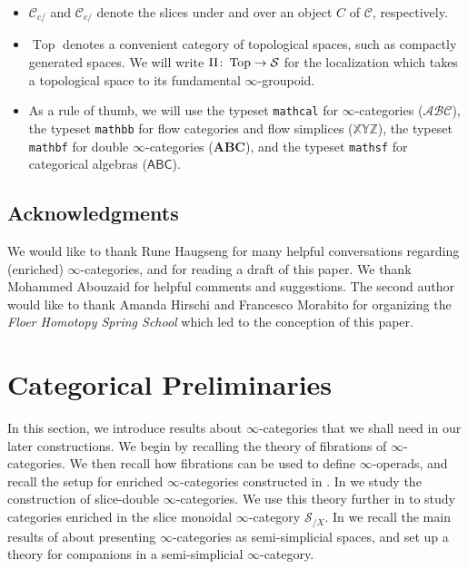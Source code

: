 \documentclass[10pt]{amsart}
\numberwithin{equation}{section}
\theoremstyle{definition}
\DeclareMathOperator{\Top}{Top}
\newcommand{\cC}{\mathcal{C}}
\newcommand{\cS}{\mathcal{S}}
\renewcommand{\to}{\mathchoice{\longrightarrow}{\rightarrow}{}{}}
\begin{document}
\begin{itemize}
	\item $\cC_{c/}$ and $\cC_{c/}$ denote the slices under and over an object $C$ of $\cC$, respectively.
	\item $\Top$ denotes a convenient category of topological spaces, such as compactly generated spaces.
  We will write $\Pi\colon \Top\to\cS$ for the localization which takes a topological space to its fundamental $\infty$-groupoid.
	\item As a rule of thumb, we will use the typeset \texttt{mathcal} for $\infty$-categories ($\mathcal{A} \mathcal{B} \mathcal{C}$), the typeset \texttt{mathbb} for flow categories and flow simplices ($\mathbb{X} \mathbb{Y} \mathbb{Z}$), the typeset \texttt{mathbf} for double $\infty$-categories ($\mathbf{A} \mathbf{B} \mathbf{C}$), and the typeset \texttt{mathsf} for categorical algebras ($\mathsf{A} \mathsf{B} \mathsf{C}$).
\end{itemize}


	\subsection*{Acknowledgments}
	We would like to thank Rune Haugseng for many helpful conversations regarding (enriched) $\infty$-categories, and for reading a draft of this paper.
  We thank Mohammed Abouzaid for helpful comments and suggestions.
  The second author would like to thank Amanda Hirschi and Francesco Morabito for organizing the \emph{Floer Homotopy Spring School} which led to the conception of this paper.

	\section{Categorical Preliminaries}\label{sec:categorical_preliminaries}

	In this section, we introduce results about $\infty$-categories that we shall need in our later constructions.
  We begin by recalling the theory of fibrations of $\infty$-categories.
  We then recall how fibrations can be used to define $\infty$-operads, and recall the setup for enriched $\infty$-categories constructed in \cite{GH}. In  we study the construction of slice-double $\infty$-categories.
  We use this theory further in  to study categories enriched in the slice monoidal $\infty$-category $\cS_{/X}$.
  In  we recall the main results of \cite{oldervoll2026quasi} about presenting $\infty$-categories as semi-simplicial spaces, and set up a theory for companions in a semi-simplicial $\infty$-category.
\end{document}
